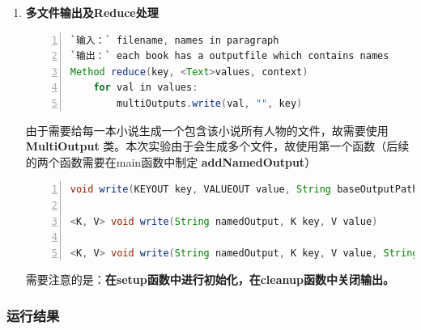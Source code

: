 \documentclass{ctexart}
\begin{document}
\begin{enumerate}[I]
\begin{lstlisting}[language=java, numbers=left, numberstyle=\tiny, frame=shadowbox, basicstyle=\ttfamily, escapeinside=``]
Method map(key, value, context)
	filename <- context.getFileName()
// get the filename which paragraph belongs to
	termsList <- ToAnalysis.parse(value)
// the names List of paragraph
	for term in termsList:
		if term.isNR and wuxiaNameList.contains(term):
			result.add(term, '\t')
	if result.length > 0
		context.write(filename, result)
	\end{lstlisting}
	\par ParMapper类在setup函数中获取\textbf{Distributed Cache}中的人名列表，并在map函数中对段落中的人名分割，只有当人名出现在列表中时，才加入结果。
	\par 将人名列表传入Mapper/Reducer 有三种处理方法：
	\par 1. 转化成字符串通过Configuration()传递，适用于少量数据 
	\par 2. 通过Distributed Cache机制，\textbf{适合本实验}的namelist.txt传递 
	\par 3. 存储到HDFS，在Map/Reduce中读取HDFS，适用于大量数据。
	\item \textbf{多文件输出及Reduce处理}
	\begin{lstlisting}[language=java, numbers=left, numberstyle=\tiny, frame=shadowbox, basicstyle=\ttfamily, escapeinside=``] 
`输入：` filename, names in paragraph
`输出：` each book has a outputfile which contains names
Method reduce(key, <Text>values, context)
	for val in values:
		multiOutputs.write(val, "", key)
	\end{lstlisting}	
	\par 由于需要给每一本小说生成一个包含该小说所有人物的文件，故需要使用 \textbf{MultiOutput} 类。本次实验由于会生成多个文件，故使用第一个函数（后续的两个函数需要在main函数中制定 \textbf{addNamedOutput}）
	\begin{lstlisting}[language=java, numbers=left, numberstyle=\tiny, frame=shadowbox, basicstyle=\ttfamily, escapeinside=``] 
void write(KEYOUT key, VALUEOUT value, String baseOutputPath)
	
<K, V> void write(String namedOutput, K key, V value)
	
<K, V> void write(String namedOutput, K key, V value, String baseOutputPath)
	\end{lstlisting}
	\par 需要注意的是：\textbf{在setup函数中进行初始化，在cleanup函数中关闭输出。}
	
	\end{enumerate}
	\subsubsection{运行结果}
\end{document}
